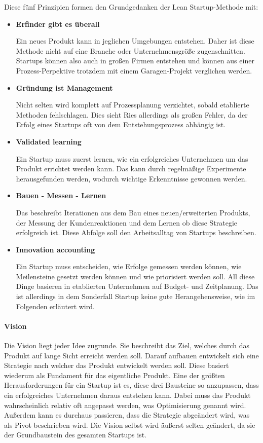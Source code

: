 Diese fünf Prinzipien formen den Grundgedanken der Lean Startup-Methode mit:
\begin{itemize}
	\item \textbf{Erfinder gibt es überall}
	
	Ein neues Produkt kann in jeglichen Umgebungen entstehen. Daher ist diese Methode nicht auf eine Branche oder Unternehmensgröße zugenschnitten. Startups können also auch in großen Firmen entstehen und können aus einer Prozess-Perpektive trotzdem mit einem Garagen-Projekt verglichen werden.
	\item \textbf{Gründung ist Management}
	
	Nicht selten wird komplett auf Prozessplanung verzichtet, sobald etablierte Methoden fehlschlagen. Dies sieht Ries allerdings als großen Fehler, da der Erfolg eines Startups oft von dem Entstehungsprozess abhängig ist.
	\item \textbf{Validated learning}
	
	Ein Startup muss zuerst lernen, wie ein erfolgreiches Unternehmen um das Produkt errichtet werden kann. Das kann durch regelmäßige Experimente herausgefunden werden, wodurch wichtige Erkenntnisse gewonnen werden.
	\item \textbf{Bauen - Messen - Lernen}
	
	Das beschreibt Iterationen aus dem Bau eines neuen/erweiterten Produkts, der Messung der Kundenreaktionen und dem Lernen ob diese Strategie erfolgreich ist. Diese Abfolge soll den Arbeitsalltag von Startups beschreiben.
	\item \textbf{Innovation accounting}
	
	Ein Startup muss entscheiden, wie Erfolge gemessen werden können, wie Meilensteine gesetzt werden können und wie priorisiert werden soll. All diese Dinge basieren in etablierten Unternehmen auf Budget- und Zeitplanung. Das ist allerdings in dem Sonderfall Startup keine gute Herangehensweise, wie im Folgenden erläutert wird.
\end{itemize}

\paragraph{Vision}
Die Vision liegt jeder Idee zugrunde. Sie beschreibt das Ziel, welches durch das Produkt auf lange Sicht erreicht werden soll. Darauf aufbauen entwickelt sich eine Strategie nach welcher das Produkt entwickelt werden soll. Diese basiert wiederum als Fundament für das eigentliche Produkt. Eine der größten Herausforderungen für ein Startup ist es, diese drei Bausteine so anzupassen, dass ein erfolgreiches Unternehmen daraus entstehen kann. Dabei muss das Produkt wahrscheinlich relativ oft angepasst werden, was Optimisierung genannt wird. Außerdem kann es durchaus passieren, dass die Strategie abgeändert wird, was als Pivot beschrieben wird. Die Vision selbst wird äußerst selten geändert, da sie der Grundbaustein des gesamten Startups ist.